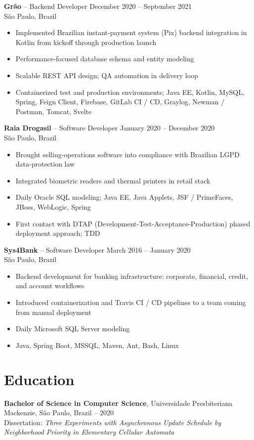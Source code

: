 \documentclass[10pt,a4paper]{article}
\begin{document}
\noindent\textbf{Grão} -- Backend Developer \hfill December 2020 -- September 2021\\
São Paulo, Brazil
\begin{itemize}
\item Implemented Brazilian instant-payment system (Pix) backend integration in Kotlin from kickoff through production launch
\item Performance-focused database schema and entity modeling
\item Scalable REST API design; QA automation in delivery loop
\item Containerized test and production environments; Java EE, Kotlin, MySQL, Spring, Feign Client, Firebase, GitLab CI / CD, Graylog, Newman / Postman, Tomcat, Svelte
\end{itemize}

\noindent\textbf{Raia Drogasil} -- Software Developer \hfill January 2020 -- December 2020\\
São Paulo, Brazil
\begin{itemize}
\item Brought selling-operations software into compliance with Brazilian LGPD data-protection law
\item Integrated biometric readers and thermal printers in retail stack
\item Daily Oracle SQL modeling; Java EE, Java Applets, JSF / PrimeFaces, JBoss, WebLogic, Spring
\item First contact with DTAP (Development-Test-Acceptance-Production) phased deployment approach; TDD
\end{itemize}

\noindent\textbf{Sys4Bank} -- Software Developer \hfill March 2016 -- January 2020\\
São Paulo, Brazil
\begin{itemize}
\item Backend development for banking infrastructure: corporate, financial, credit, and account workflows
\item Introduced containerization and Travis CI / CD pipelines to a team coming from manual deployment
\item Daily Microsoft SQL Server modeling
\item Java, Spring Boot, MSSQL, Maven, Ant, Bash, Linux
\end{itemize}

\section{Education}
\noindent\textbf{Bachelor of Science in Computer Science}, Universidade Presbiteriana Mackenzie, São Paulo, Brazil -- 2020\\
Dissertation: \textit{Three Experiments with Asynchronous Update Schedule by Neighborhood Priority in Elementary Cellular Automata}
\end{document}
